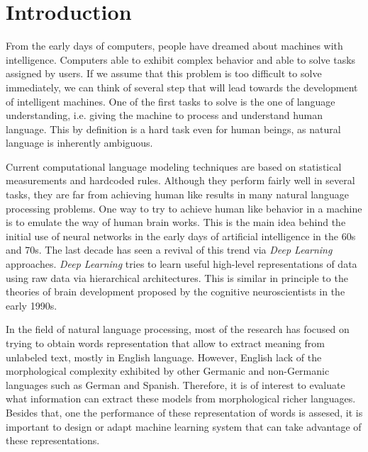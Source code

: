 \chapter{Introduction}
\label{chapter:Introduction}


From the early days of computers, people have dreamed about machines with intelligence. Computers able to exhibit complex behavior and able to solve tasks assigned by users. If we assume that this problem is too difficult to solve immediately, we can think of several step that will lead towards the development of intelligent machines. One of the first tasks to solve is the one of language understanding, i.e. giving the machine to process and understand human language. This by definition is a hard task even for human beings, as natural language is inherently ambiguous.


Current computational language modeling techniques are based on statistical
measurements and hardcoded rules. Although they perform fairly well in
several tasks, they are far from achieving human like results in many natural
language processing problems. One way to try to achieve human like behavior
in a machine is to emulate the way of human brain works. This is the main
idea behind the initial use of neural networks in the early days of
artificial intelligence in the 60s and 70s. The last decade has seen a
revival of this trend via  \textit{Deep Learning} approaches. \textit{Deep Learning} tries to learn useful high-level representations of data using raw data via hierarchical architectures. This is similar in principle to the theories of brain development proposed by the cognitive neuroscientists in the early 1990s.

In the field of natural language processing, most of the research  has
focused on  trying to obtain words representation that allow to extract
meaning from unlabeled text, mostly in English language.  However,  English
lack of the morphological complexity exhibited by other Germanic and
non-Germanic languages such as German and Spanish. Therefore, it  is of
interest to evaluate what information can extract these models from
morphological richer languages. Besides that, one the performance of these
representation of words is assesed, it is important to design or adapt
machine learning system that can take advantage of these representations.




